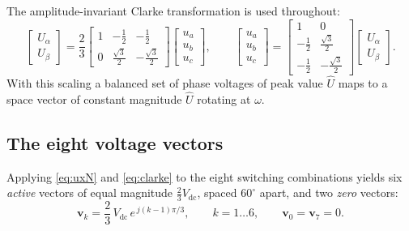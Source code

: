 \documentclass[11pt,a4paper]{article}
\newcommand{\vdc}{V_{\mathrm{dc}}}
\begin{document}
The amplitude-invariant Clarke transformation is used throughout:
\begin{equation}
\begin{bmatrix} U_\alpha \\ U_\beta \end{bmatrix}
=
\frac{2}{3}
\begin{bmatrix}
1 & -\tfrac{1}{2} & -\tfrac{1}{2} \\[2mm]
0 & \tfrac{\sqrt{3}}{2} & -\tfrac{\sqrt{3}}{2}
\end{bmatrix}
\begin{bmatrix} u_a \\ u_b \\ u_c \end{bmatrix},
\qquad
\begin{bmatrix} u_a \\ u_b \\ u_c \end{bmatrix}
=
\begin{bmatrix}
1 & 0 \\[1mm]
-\tfrac{1}{2} & \tfrac{\sqrt{3}}{2} \\[1mm]
-\tfrac{1}{2} & -\tfrac{\sqrt{3}}{2}
\end{bmatrix}
\begin{bmatrix} U_\alpha \\ U_\beta \end{bmatrix}.
\label{eq:clarke}
\end{equation}
With this scaling a balanced set of phase voltages of peak value $\hat{U}$ maps to a
space vector of constant magnitude $\hat{U}$ rotating at $\omega$.

\subsection{The eight voltage vectors}

Applying \eqref{eq:uxN} and \eqref{eq:clarke} to the eight switching combinations
yields six \emph{active} vectors of equal magnitude $\tfrac{2}{3}\vdc$, spaced
$60^\circ$ apart, and two \emph{zero} vectors:
\begin{equation}
\bm{v}_k = \frac{2}{3}\,\vdc\, e^{\,j(k-1)\pi/3}, \qquad k = 1 \dots 6,
\qquad \bm{v}_0 = \bm{v}_7 = 0 .
\end{equation}
\end{document}
